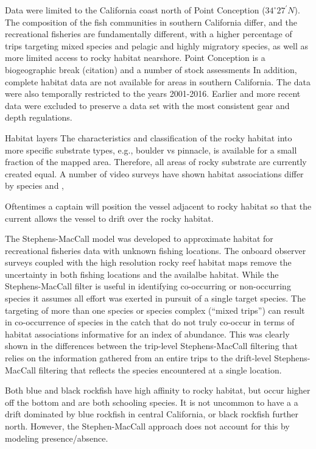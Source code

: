 \documentclass[
  12pt,
  authoryear,
  preprint,
  3p]{elsarticle}
\begin{document}
Data were limited to the California coast north of Point Conception
(\(34^\circ 27^\prime N\)). The composition of the fish communities in
southern California differ, and the recreational fisheries are
fundamentally different, with a higher percentage of trips targeting
mixed species and pelagic and highly migratory species, as well as more
limited access to rocky habitat nearshore. Point Conception is a
biogeographic break (citation) and a number of stock assessments In
addition, complete habitat data are not available for areas in southern
California. The data were also temporally restricted to the years
2001-2016. Earlier and more recent data were excluded to preserve a data
set with the most consistent gear and depth regulations.

Habitat layers The characteristics and classification of the rocky
habitat into more specific substrate types, e.g., boulder vs pinnacle,
is available for a small fraction of the mapped area. Therefore, all
areas of rocky substrate are currently created equal. A number of video
surveys have shown habitat associations differ by species and ,

Oftentimes a captain will position the vessel adjacent to rocky habitat
so that the current allows the vessel to drift over the rocky habitat.

The Stephens-MacCall model was developed to approximate habitat for
recreational fisheries data with unknown fishing locations. The onboard
observer surveys coupled with the high resolution rocky reef habitat
maps remove the uncertainty in both fishing locations and the availalbe
habitat. While the Stephens-MacCall filter is useful in identifying
co-occurring or non-occurring species it assumes all effort was exerted
in pursuit of a single target species. The targeting of more than one
species or species complex (``mixed trips'') can result in co-occurrence
of species in the catch that do not truly co-occur in terms of habitat
associations informative for an index of abundance. This was clearly
shown in the differences between the trip-level Stephens-MacCall
filtering that relies on the information gathered from an entire trips
to the drift-level Stephens-MacCall filtering that reflects the species
encountered at a single location.

Both blue and black rockfish have high affinity to rocky habitat, but
occur higher off the bottom and are both schooling species. It is not
uncommon to have a a drift dominated by blue rockfish in central
California, or black rockfish further north. However, the
Stephen-MacCall approach does not account for this by modeling
presence/absence.
\end{document}
